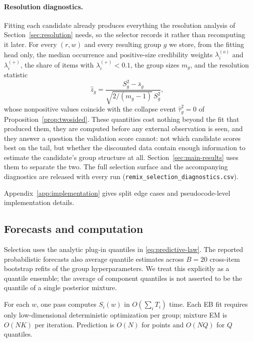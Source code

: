 \documentclass[twocolumn,10pt]{article}
\theoremstyle{definition}
\begin{document}
\paragraph{Resolution diagnostics.}
Fitting each candidate already produces everything the resolution
analysis of Section~\ref{sec:resolution} needs, so the selector records it
rather than recomputing it later. For every $(r,w)$ and every resulting
group $g$ we store, from the fitting head only, the median occurrence and
positive-size credibility weights $\lambda_i^{(o)}$ and $\lambda_i^{(+)}$,
the share of items with $\lambda_i^{(+)}<0.1$, the group sizes $m_g$, and
the resolution statistic
\[
\hat z_g=\frac{S_g^2-\bar s_g}{\sqrt{2/(m_g-1)}\,S_g^2},
\]
whose nonpositive values coincide with the collapse event
$\hat\tau_g^2=0$ of Proposition~\ref{prop:twosided}. These quantities cost
nothing beyond the fit that produced them, they are computed before any
external observation is seen, and they answer a question the validation
score cannot: not which candidate scores best on the tail, but whether the
discounted data contain enough information to estimate the candidate's
group structure at all. Section~\ref{sec:main-results} uses them to
separate the two. The full selection surface and the accompanying
diagnostics are released with every run
(\texttt{remix\_selection\_diagnostics.csv}).

Appendix~\ref{app:implementation} gives split edge cases and
pseudocode-level implementation details.

\subsection{Forecasts and computation}\label{sec:complexity}

Selection uses the analytic plug-in quantiles in
\eqref{eq:predictive-law}. The reported probabilistic forecasts also
average quantile estimates across $B=20$ cross-item bootstrap refits of
the group hyperparameters. We treat this explicitly as a quantile
ensemble; the average of component quantiles is not asserted to be the
quantile of a single posterior mixture.

For each $w$, one pass computes $S_i(w)$ in $O(\sum_iT_i)$ time. Each EB
fit requires only low-dimensional deterministic optimization per group;
mixture EM is $O(NK)$ per iteration. Prediction is $O(N)$ for points and
$O(NQ)$ for $Q$ quantiles.
\end{document}
